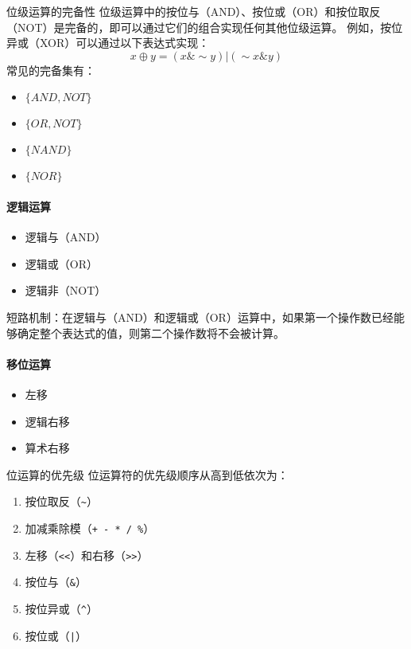 \begin{sidenote}{位级运算的完备性}
    位级运算中的按位与（AND）、按位或（OR）和按位取反（NOT）是完备的，即可以通过它们的组合实现任何其他位级运算。
    例如，按位异或（XOR）可以通过以下表达式实现：
    $$ x \oplus y = (x \& \sim y) | (\sim x \& y) $$
    常见的完备集有：
    \begin{itemize}
        \item $\{AND, NOT\}$
        \item $\{OR, NOT\}$
        \item $\{NAND\}$
        \item $\{NOR\}$
    \end{itemize}
\end{sidenote}

\paragraph{逻辑运算}
\begin{itemize}
    \item 逻辑与（AND）
    \item 逻辑或（OR）
    \item 逻辑非（NOT）
\end{itemize}

短路机制：在逻辑与（AND）和逻辑或（OR）运算中，如果第一个操作数已经能够确定整个表达式的值，则第二个操作数将不会被计算。

\paragraph{移位运算}
\begin{itemize}
    \item 左移
    \item 逻辑右移
    \item 算术右移
\end{itemize}

\begin{sidenote}{位运算的优先级}
    位运算符的优先级顺序从高到低依次为：
    \begin{enumerate}
        \item 按位取反（\verb|~|）
        \item 加减乘除模（\verb|+ - * / %|）
        \item 左移（\verb|<<|）和右移（\verb|>>|）
        \item 按位与（\verb|&|）
        \item 按位异或（\verb|^|）
        \item 按位或（\verb!|!）
    \end{enumerate}
\end{sidenote}

